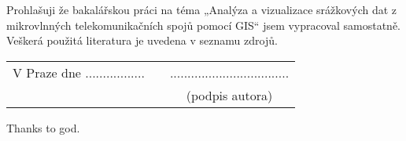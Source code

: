 \newcommand{\odsaditodzhora}{\hskip1pt\vfill}

\odsaditodzhora
{}

 \baselineskip

Prohlašuji že bakalářskou práci na téma „Analýza a vizualizace
srážkových dat z mikrovlnných telekomunikačních spojů pomocí GIS“ jsem
vypracoval samostatně. Veškerá použitá literatura je uvedena v seznamu
zdrojů.

\begin{flushleft}
\begin{tabular}{cp{}c}
V Praze dne .................
& 
&
..................................
\\
&&
(podpis autora)
\end{tabular}

\end{flushleft}
\newpage

\odsaditodzhora
{}

 \baselineskip

Thanks to god.
\newpage
